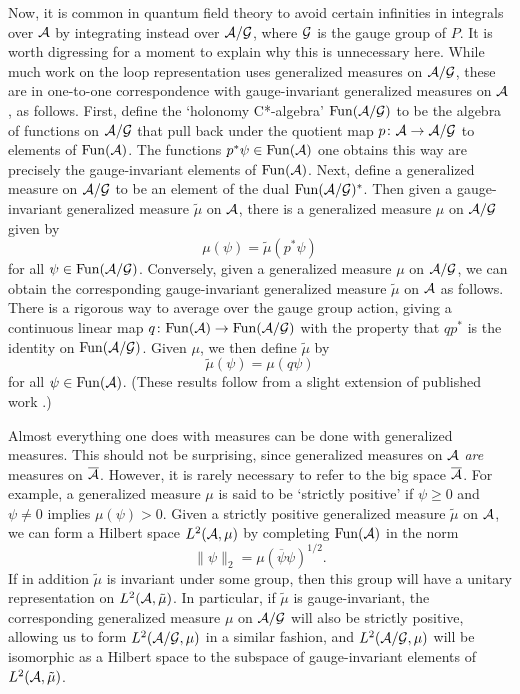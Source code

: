 Now, it is common in quantum field theory to avoid certain infinities in
integrals over $\A$ by integrating instead over $\A/\G$, where $\G$ is
the gauge group of $P$.  It is worth digressing for a moment to explain
why this is unnecessary here.  While much work on the loop
representation uses generalized measures on $\A/\G$, these are in
one-to-one correspondence with gauge-invariant generalized measures on
$\A$, as follows.  First, define the `holonomy C*-algebra' $\Fun(\A/\G)$
to be the algebra of functions on $\A/\G$ that pull back under the
quotient map $p\maps \A \to \A/\G$ to elements of $\Fun(\A)$.  The
functions $p^\ast \psi \in \Fun(\A)$ one obtains this way are precisely the
gauge-invariant elements of $\Fun(\A)$.    Next, define a generalized
measure on $\A/\G$ to be an element of the dual $\Fun(\A/\G)^\ast$.
Then given a gauge-invariant generalized measure $\tilde \mu$ on $\A$,
there is a generalized measure $\mu$ on $\A/\G$ given by
\[         \mu(\psi) = \tilde\mu(p^\ast \psi)  \]
for all $\psi \in \Fun(\A/\G)$.  Conversely, given a generalized measure
$\mu$ on $\A/\G$, we can obtain the corresponding gauge-invariant
generalized measure $\tilde \mu$ on $\A$ as follows.  There is a
rigorous way to average over the gauge group action, giving a continuous
linear map $q \maps \Fun(\A) \to \Fun(\A/\G)$ with the property that
$qp^\ast$ is the identity on $\Fun(\A/\G)$.  Given $\mu$, we then define
$\tilde \mu$ by
\[         \tilde \mu(\psi) = \mu(q\psi)  \]
for all $\psi \in \Fun(\A)$.  (These results follow from a slight extension
of published work \cite{Baez3}.)

Almost everything one does with measures can be done with generalized
measures.  This should not be surprising, since generalized measures on
$\A$ {\it are} measures on $\overline \A$.  However, it is rarely
necessary to refer to the big space $\overline \A$.  For example, a
generalized measure $\mu$ is said to be `strictly positive' if $\psi \ge 0$
and $\psi \ne 0$ implies $\mu(\psi) > 0$.  Given a strictly positive
generalized measure $\tilde \mu$ on $\A$, we can form a Hilbert space
$L^2(\A,\mu)$ by completing $\Fun(\A)$ in the norm
\[      \|\psi\|_2 = \mu(\overline \psi \psi)^{1/2}   .\]
If in addition $\tilde \mu$ is invariant under some group, then this
group will have a unitary representation on $L^2(\A,\tilde\mu)$.  In
particular, if $\tilde\mu$ is gauge-invariant, the corresponding
generalized measure $\mu$ on $\A/\G$ will also be strictly positive,
allowing us to form $L^2(\A/\G,\mu)$ in a similar fashion, and
$L^2(\A/\G,\mu)$ will be isomorphic as a Hilbert space to the subspace
of gauge-invariant elements of $L^2(\A, \tilde \mu)$.

